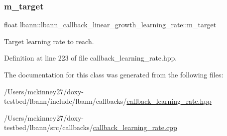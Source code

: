 \subsubsection{\texorpdfstring{m\+\_\+target}{m\_target}}
{\footnotesize\ttfamily float lbann\+::lbann\+\_\+callback\+\_\+linear\+\_\+growth\+\_\+learning\+\_\+rate\+::m\+\_\+target\hspace{0.3cm}{\ttfamily [private]}}



Target learning rate to reach. 



Definition at line 223 of file callback\+\_\+learning\+\_\+rate.\+hpp.



The documentation for this class was generated from the following files\+:\begin{DoxyCompactItemize}
\item 
/\+Users/mckinney27/doxy-\/testbed/lbann/include/lbann/callbacks/\hyperlink{callback__learning__rate_8hpp}{callback\+\_\+learning\+\_\+rate.\+hpp}\item 
/\+Users/mckinney27/doxy-\/testbed/lbann/src/callbacks/\hyperlink{callback__learning__rate_8cpp}{callback\+\_\+learning\+\_\+rate.\+cpp}\end{DoxyCompactItemize}
